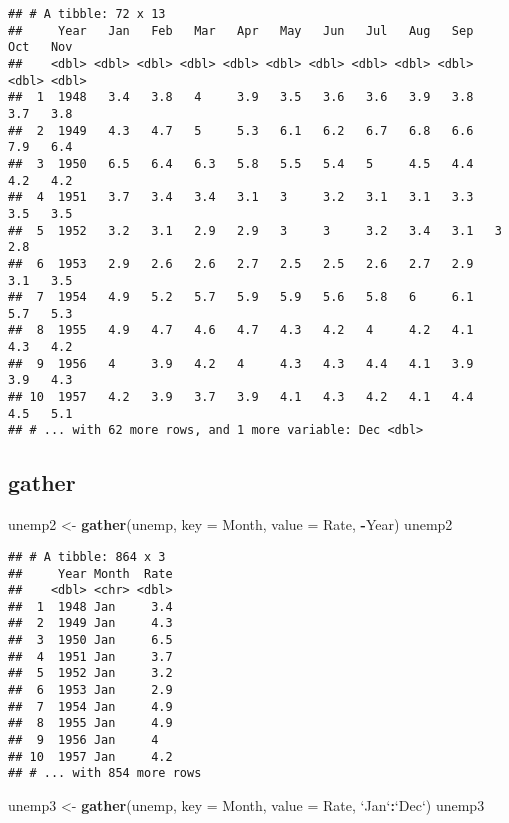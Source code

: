 \documentclass[]{book}
\newenvironment{Shaded}{\begin{snugshade}}{\end{snugshade}}
\newcommand{\DataTypeTok}[1]{\textcolor[rgb]{0.13,0.29,0.53}{#1}}
\newcommand{\KeywordTok}[1]{\textcolor[rgb]{0.13,0.29,0.53}{\textbf{#1}}}
\newcommand{\NormalTok}[1]{#1}
\newcommand{\OperatorTok}[1]{\textcolor[rgb]{0.81,0.36,0.00}{\textbf{#1}}}
\newcommand{\StringTok}[1]{\textcolor[rgb]{0.31,0.60,0.02}{#1}}
\begin{document}
\begin{verbatim}
## # A tibble: 72 x 13
##     Year   Jan   Feb   Mar   Apr   May   Jun   Jul   Aug   Sep   Oct   Nov
##    <dbl> <dbl> <dbl> <dbl> <dbl> <dbl> <dbl> <dbl> <dbl> <dbl> <dbl> <dbl>
##  1  1948   3.4   3.8   4     3.9   3.5   3.6   3.6   3.9   3.8   3.7   3.8
##  2  1949   4.3   4.7   5     5.3   6.1   6.2   6.7   6.8   6.6   7.9   6.4
##  3  1950   6.5   6.4   6.3   5.8   5.5   5.4   5     4.5   4.4   4.2   4.2
##  4  1951   3.7   3.4   3.4   3.1   3     3.2   3.1   3.1   3.3   3.5   3.5
##  5  1952   3.2   3.1   2.9   2.9   3     3     3.2   3.4   3.1   3     2.8
##  6  1953   2.9   2.6   2.6   2.7   2.5   2.5   2.6   2.7   2.9   3.1   3.5
##  7  1954   4.9   5.2   5.7   5.9   5.9   5.6   5.8   6     6.1   5.7   5.3
##  8  1955   4.9   4.7   4.6   4.7   4.3   4.2   4     4.2   4.1   4.3   4.2
##  9  1956   4     3.9   4.2   4     4.3   4.3   4.4   4.1   3.9   3.9   4.3
## 10  1957   4.2   3.9   3.7   3.9   4.1   4.3   4.2   4.1   4.4   4.5   5.1
## # ... with 62 more rows, and 1 more variable: Dec <dbl>
\end{verbatim}

\hypertarget{gather}{%
\subsection*{\texorpdfstring{\textbf{gather}}{gather}}\label{gather}}

\begin{Shaded}
\begin{Highlighting}[]
\NormalTok{unemp2 <-}\StringTok{ }\KeywordTok{gather}\NormalTok{(unemp, }\DataTypeTok{key =}\NormalTok{ Month, }\DataTypeTok{value =}\NormalTok{ Rate, }\OperatorTok{-}\NormalTok{Year)}
\NormalTok{unemp2}
\end{Highlighting}
\end{Shaded}

\begin{verbatim}
## # A tibble: 864 x 3
##     Year Month  Rate
##    <dbl> <chr> <dbl>
##  1  1948 Jan     3.4
##  2  1949 Jan     4.3
##  3  1950 Jan     6.5
##  4  1951 Jan     3.7
##  5  1952 Jan     3.2
##  6  1953 Jan     2.9
##  7  1954 Jan     4.9
##  8  1955 Jan     4.9
##  9  1956 Jan     4  
## 10  1957 Jan     4.2
## # ... with 854 more rows
\end{verbatim}

\begin{Shaded}
\begin{Highlighting}[]
\NormalTok{unemp3 <-}\StringTok{ }\KeywordTok{gather}\NormalTok{(unemp, }\DataTypeTok{key =}\NormalTok{ Month, }\DataTypeTok{value =}\NormalTok{ Rate, }\StringTok{`}\DataTypeTok{Jan}\StringTok{`}\OperatorTok{:}\StringTok{`}\DataTypeTok{Dec}\StringTok{`}\NormalTok{)}
\NormalTok{unemp3}
\end{Highlighting}
\end{Shaded}
\end{document}
